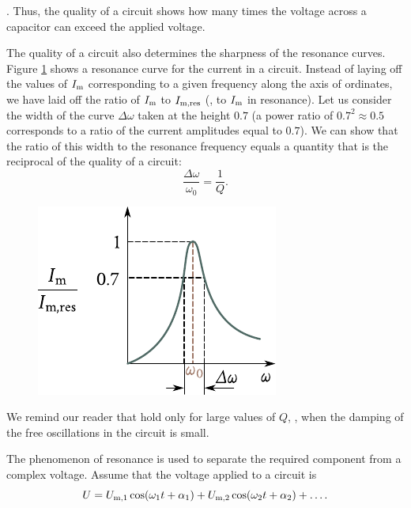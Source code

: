 \noindent
[we have assumed in \eqn{13_38} that $\omega=\ab{\omega}{$U$,res}=\omega_0$.
Here, $Q$ is the quality of the circuit [see \eqn{13_22}].
Thus, the quality of a circuit shows how many times the voltage across a capacitor can exceed the applied voltage.

The quality of a circuit also determines the sharpness of the resonance curves.
Figure \ref{fig:13_9} shows a resonance curve for the
current in a circuit.
Instead of laying off the values of $I_{\text{m}}$ corresponding to a given frequency along the axis of ordinates, we have laid off the ratio of $I_{\text{m}}$ to $I_{\text{m,res}}$ (\ie, to $I_{\text{m}}$ in resonance).
Let us consider the width of the curve $\Delta{\omega}$ taken at the height $0.7$ (a power ratio of $0.7^2\approx 0.5$ corresponds to a ratio of the current amplitudes equal to $0.7$).
We can show that the ratio of this width to the resonance frequency equals a quantity that is the reciprocal of the quality of a circuit:
\begin{equation}\label{eq:13_44}
    \frac{\Delta{\omega}}{\omega_0} = \frac{1}{Q}.
\end{equation}

\begin{figure}[t]
	\begin{center}
		\includegraphics[scale=1]{figures/ch_13/fig_13_9.pdf}
		\caption[]{}
		\label{fig:13_9}
	\end{center}
	\vspace{-0.8cm}
\end{figure}

We remind our reader that  hold only for large values of $Q$, \ie, when the damping of the free oscillations in the circuit is small.

The phenomenon of resonance is used to separate the required component from a complex voltage.
Assume that the voltage applied to a circuit is
\begin{equation*}
    U = U_{\text{m,$1$}} \cos(\omega_1 t + \alpha_1) + U_{\text{m,$2$}} \cos(\omega_2 t + \alpha_2) + \ldots.
\end{equation*}


